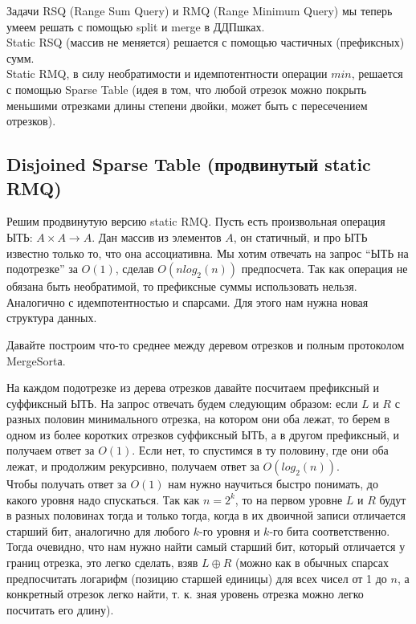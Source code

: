 Задачи RSQ (Range Sum Query) и RMQ (Range Minimum Query) мы теперь умеем решать с помощью split и merge в ДДПшках. \\
Static RSQ (массив не меняется) решается с помощью частичных (префиксных) сумм. \\
Static RMQ, в силу необратимости и идемпотентности операции $min$, решается с помощью Sparse Table (идея в том, что любой отрезок можно покрыть меньшими отрезками длины степени двойки, может быть с пересечением отрезков).


\subsection{Disjoined Sparse Table (продвинутый static RMQ)}


Решим продвинутую версию static RMQ. Пусть есть произвольная операция ЫТЬ: $A \times A \rightarrow A$. Дан массив из элементов $A$, он статичный, и про ЫТЬ известно только то, что она ассоциативна. Мы хотим отвечать на запрос ``ЫТЬ на подотрезке'' за $O(1)$, сделав $O(n log_2(n))$ предпосчета. Так как операция не обязана быть необратимой, то префиксные суммы использовать нельзя. Аналогично с идемпотентностью и спарсами. Для этого нам нужна новая структура данных.

Давайте построим что-то среднее между деревом отрезков и полным протоколом MergeSortа.

На каждом подотрезке из дерева отрезков давайте посчитаем префиксный и суффиксный ЫТЬ. На запрос отвечать будем следующим образом: если $L$ и $R$ с разных половин минимального отрезка, на котором они оба лежат, то берем в одном из более коротких отрезков суффиксный ЫТЬ, а в другом префиксный, и получаем ответ за $O(1)$. Если нет, то спустимся в ту половину, где они оба лежат, и продолжим рекурсивно, получаем ответ за $O(log_2(n))$. \\

Чтобы получать ответ за $O(1)$ нам нужно научиться быстро понимать, до какого уровня надо спускаться. Так как $n = 2^k$, то на первом уровне $L$ и $R$ будут в разных половинах тогда и только тогда, когда в их двоичной записи отличается старший бит, аналогично для любого $k$-го уровня и $k$-го бита соответственно. Тогда очевидно, что нам нужно найти самый старший бит, который отличается у границ отрезка, это легко сделать, взяв $L \oplus R$ (можно как в обычных спарсах предпосчитать логарифм (позицию старшей единицы) для всех чисел от 1 до $n$, а конкретный отрезок легко найти, т. к. зная уровень отрезка можно легко посчитать его длину).

